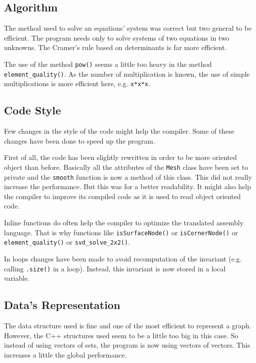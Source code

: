 \documentclass[fleqn,11pt]{SelfArx} %
\begin{document}
\subsection{Algorithm}

The method used to solve an equations' system was correct but two general to be efficient. The program needs only to solve systems of two equations in two unknowns. The Cramer's rule based on determinants is far more efficient.

The use of the method \verb+pow()+ seems a little too heavy in the method \verb+element_quality()+. As the number of multiplication is known, the use of simple multiplications is more efficient here, e.g. \verb+x*x*x+.

\subsection{Code Style}

Few changes in the style of the code might help the compiler. Some of these changes have been done to speed up the program.

First of all, the code has been slightly rewritten in order to be more oriented object than before. Basically all the attributes of the \verb+Mesh+ class have been set to private and the \verb+smooth+ function is now a method of this class. This did not really increase the performance. But this was for a better readability. It might also help the compiler to improve its compiled code as it is used to read object oriented code. 

Inline functions do often help the compiler to optimize the translated assembly language. That is why functions like \verb+isSurfaceNode()+ or \verb+isCornerNode()+ or \verb+element_quality()+ or \verb+svd_solve_2x2()+.

In loops changes have been made to avoid recomputation of the invariant (e.g. calling \verb+.size()+ in a loop). Instead, this invariant is now stored in a local variable.

\subsection{Data's Representation}

The data structure used is fine and one of the most efficient to represent a graph. However, the C++ structures used seem to be a little too big in this case. So instead of using vectors of sets, the program is now using vectors of vectors. This increases a little the global performance.
\end{document}
